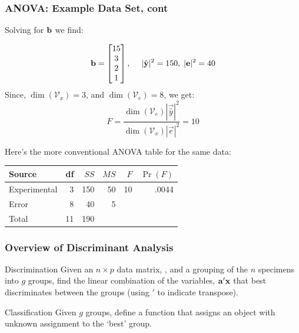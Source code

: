 \documentclass{beamer}
\begin{document}
\begin{frame}[fragile]
  \frametitle{ANOVA: Example Data Set, cont}
\small

Solving for $\mathbf{b}$ we find:

\begin{equation*}
\mathbf{b} = \begin{bmatrix}
15 \\ 3 \\ 2 \\ 1
\end{bmatrix},
\; \quad |\hat{\mathbf{y}}|^2 = 150, \;|\mathbf{e}|^2 = 40 
\end{equation*}
Since, $\dim(\mathcal{V}_x) = 3$, and $\dim(\mathcal{V}_e)= 8$,  we get:
\begin{equation*}
  F = \frac{\dim(\mathcal{V}_e)|\vec{\hat{y}}|^2}
              {\dim(\mathcal{V}_x)|\vec{e}|^2}
    = 10
\end{equation*}
 
Here's the more conventional ANOVA table for the same data:
\footnotesize
\begin{center}
\begin{tabular}{lrrrrr}
  \toprule
 Source & df & $SS$ & $MS$ & $F$ & $\Pr(F)$ \\
  \midrule
 Experimental  & 3 & 150 & 50 & 10 & .0044\\
 Error  & 8  & 40 & 5 & \\
 \midrule
 Total & 11 & 190 & &\\
\bottomrule    
\end{tabular} 
\end{center}


\end{frame}



\begin{frame}
  \frametitle{Overview of Discriminant Analysis}

\begin{block}{Discrimination}
Given an $n \times p$ data matrix, , and a grouping of the $n$ specimens into $g$ groups, find the linear combination of the variables, $\mathbf{a}'\mathbf{x}$ that best discriminates between the groups (using $'$ to indicate transpose). 
\end{block}

\begin{block}{Classification}
Given $g$ groups, define a function that assigns an object with unknown assignment to the `best' group.
\end{block}


\end{frame}
\end{document}
